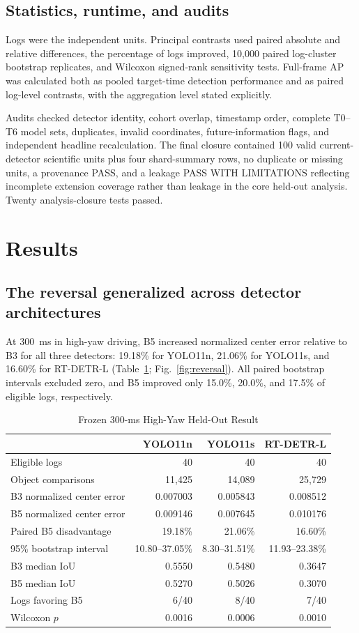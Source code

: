 \documentclass[journal]{IEEEtran}
\begin{document}
\subsection{Statistics, runtime, and audits}
Logs were the independent units. Principal contrasts used paired absolute and relative differences, the percentage of logs improved, 10,000 paired log-cluster bootstrap replicates, and Wilcoxon signed-rank sensitivity tests. Full-frame AP was calculated both as pooled target-time detection performance and as paired log-level contrasts, with the aggregation level stated explicitly.

Audits checked detector identity, cohort overlap, timestamp order, complete T0--T6 model sets, duplicates, invalid coordinates, future-information flags, and independent headline recalculation. The final closure contained 100 valid current-detector scientific units plus four shard-summary rows, no duplicate or missing units, a provenance PASS, and a leakage PASS WITH LIMITATIONS reflecting incomplete extension coverage rather than leakage in the core held-out analysis. Twenty analysis-closure tests passed.

\section{Results}
\subsection{The reversal generalized across detector architectures}
At 300~ms in high-yaw driving, B5 increased normalized center error relative to B3 for all three detectors: 19.18\% for YOLO11n, 21.06\% for YOLO11s, and 16.60\% for RT-DETR-L (Table~\ref{tab:primary}; Fig.~\ref{fig:reversal}). All paired bootstrap intervals excluded zero, and B5 improved only 15.0\%, 20.0\%, and 17.5\% of eligible logs, respectively.

\begin{table}[!t]
\caption{Frozen 300-ms High-Yaw Held-Out Result}
\label{tab:primary}
\centering
\footnotesize
\begin{tabular}{@{}lrrr@{}}
\toprule
 & YOLO11n & YOLO11s & RT-DETR-L \\
\midrule
Eligible logs & 40 & 40 & 40 \\
Object comparisons & 11,425 & 14,089 & 25,729 \\
B3 normalized center error & 0.007003 & 0.005843 & 0.008512 \\
B5 normalized center error & 0.009146 & 0.007645 & 0.010176 \\
Paired B5 disadvantage & 19.18\% & 21.06\% & 16.60\% \\
95\% bootstrap interval & 10.80--37.05\% & 8.30--31.51\% & 11.93--23.38\% \\
B3 median IoU & 0.5550 & 0.5480 & 0.3647 \\
B5 median IoU & 0.5270 & 0.5026 & 0.3070 \\
Logs favoring B5 & 6/40 & 8/40 & 7/40 \\
Wilcoxon $p$ & 0.0016 & 0.0006 & 0.0010 \\
\bottomrule
\end{tabular}
\end{table}
\end{document}
